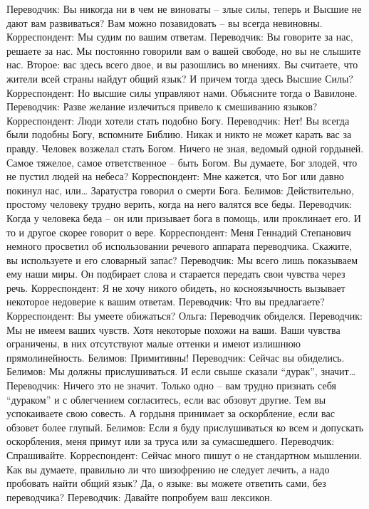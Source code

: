 Переводчик: Вы никогда ни в чем не виноваты – злые силы, теперь и Высшие не дают вам развиваться? Вам можно позавидовать – вы всегда невиновны.
Корреспондент: Мы судим по вашим ответам.
Переводчик: Вы говорите за нас, решаете за нас. Мы постоянно говорили вам о вашей свободе, но вы не слышите нас. Второе: вас здесь всего двое, и вы разошлись во мнениях. Вы считаете, что жители всей страны найдут общий язык? И причем тогда здесь Высшие Силы?
Корреспондент: Но высшие силы управляют нами. Объясните тогда о Вавилоне.
Переводчик: Разве желание излечиться привело к смешиванию языков?
Корреспондент: Люди хотели стать подобно Богу.
Переводчик: Нет! Вы всегда были подобны Богу, вспомните Библию. Никак и никто не может карать вас за правду. Человек возжелал стать Богом. Ничего не зная, ведомый одной гордыней. Самое тяжелое, самое ответственное – быть Богом. Вы думаете, Бог злодей, что не пустил людей на небеса?
Корреспондент: Мне кажется, что Бог или давно покинул нас, или… Заратустра говорил о смерти Бога.
Белимов: Действительно, простому человеку трудно верить, когда на него валятся все беды.
Переводчик: Когда у человека беда – он или призывает бога в помощь, или проклинает его. И то и другое скорее говорит о вере.
Корреспондент: Меня Геннадий Степанович немного просветил об использовании речевого аппарата переводчика. Скажите, вы используете и его словарный запас?
Переводчик: Мы всего лишь показываем ему наши миры. Он подбирает слова и старается передать свои чувства через речь.
Корреспондент: Я не хочу никого обидеть, но косноязычность вызывает некоторое недоверие к вашим ответам.
Переводчик: Что вы предлагаете?
Корреспондент: Вы умеете обижаться?
Ольга: Переводчик обиделся.
Переводчик: Мы не имеем ваших чувств. Хотя некоторые похожи на ваши. Ваши чувства ограничены, в них отсутствуют малые оттенки и имеют излишнюю прямолинейность.
Белимов: Примитивны!
Переводчик: Сейчас вы обиделись.
Белимов: Мы должны прислушиваться. И если свыше сказали ``дурак'', значит…
Переводчик: Ничего это не значит. Только одно – вам трудно признать себя ``дураком'' и с облегчением согласитесь, если вас обзовут другие. Тем вы успокаиваете свою совесть. А гордыня принимает за оскорбление, если вас обзовет более глупый.
Белимов: Если я буду прислушиваться ко всем и допускать оскорбления, меня примут или за труса или за сумасшедшего.
Переводчик: Спрашивайте.
Корреспондент: Сейчас много пишут о не стандартном мышлении. Как вы думаете, правильно ли что шизофрению не следует лечить, а надо пробовать найти общий язык? Да, о языке: вы можете ответить сами, без переводчика?
Переводчик: Давайте попробуем ваш лексикон.
